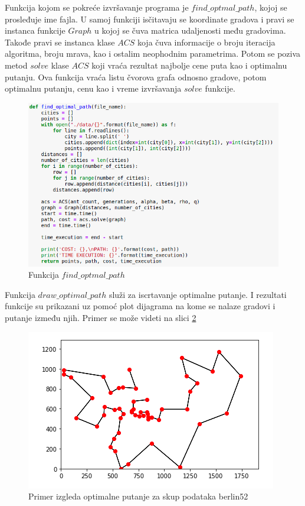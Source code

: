 \documentclass[a4paper]{article}
\begin{document}
Funkcija kojom se pokreće izvršavanje programa je $find\_optmal\_path$, kojoj se prosleđuje ime fajla. U samoj funkciji isčitavaju se koordinate gradova i pravi se instanca funkcije $Graph$ u kojoj se 
čuva matrica udaljenosti među gradovima. Takođe pravi se instanca klase $ACS$ koja čuva informacije o broju iteracija algoritma, broju mrava, kao i ostalim neophodnim parametrima. Potom se poziva metod $solve$ klase $ACS$ koji vraća rezultat najbolje cene puta kao i optimalnu putanju. Ova funkcija vraća listu čvorova grafa odnosno gradove, potom optimalnu putanju, cenu kao i vreme izvršavanja $solve$ funkcije. 

\begin{figure}[h!]
\begin{center}
\includegraphics[width=1\columnwidth]{slika9.png}
\end{center}
\caption{Funkcija $find\_optmal\_path$}
\label{fig:slika5}
\end{figure}

Funkcija $draw\_optimal\_path$ služi za iscrtavanje optimalne putanje. I rezultati funkcije su prikazani uz pomoć plot dijagrama na kome se nalaze gradovi i putanje između njih. Primer se može videti na slici \ref{fig:slika10}


\begin{figure}[h!]
\begin{center}
\includegraphics[scale=0.7]{slika10.png}
\end{center}
\caption{Primer izgleda optimalne putanje za skup podataka berlin52}
\label{fig:slika10}
\end{figure}
\end{document}
